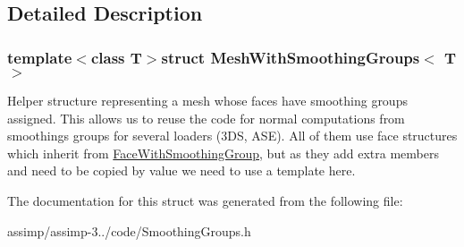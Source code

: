 \subsection{Detailed Description}
\subsubsection*{template$<$class T$>$struct Mesh\+With\+Smoothing\+Groups$<$ T $>$}

Helper structure representing a mesh whose faces have smoothing groups assigned. This allows us to reuse the code for normal computations from smoothings groups for several loaders (3\+D\+S, A\+S\+E). All of them use face structures which inherit from \hyperlink{struct_face_with_smoothing_group}{Face\+With\+Smoothing\+Group}, but as they add extra members and need to be copied by value we need to use a template here. 

The documentation for this struct was generated from the following file\+:\begin{DoxyCompactItemize}
\item 
assimp/assimp-\/3../code/Smoothing\+Groups.\+h\end{DoxyCompactItemize}
